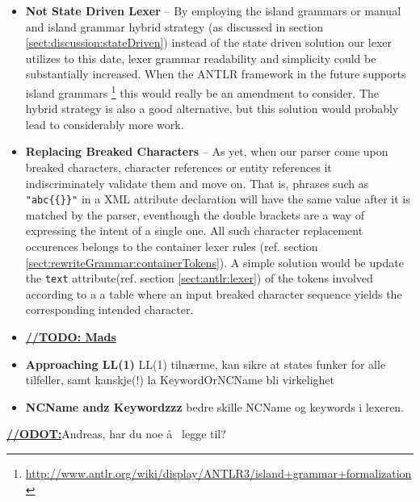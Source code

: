 \begin{itemize}

\item \textbf{Not State Driven Lexer} -- By employing the island grammars or manual and island grammar hybrid strategy (as discussed in section \ref{sect:discussion:stateDriven}) instead of the state driven solution our lexer utilizes to this date, lexer grammar readability and simplicity could be substantially increased. When the ANTLR framework in the future supports island grammars \footnote{\url{http://www.antlr.org/wiki/display/ANTLR3/island+grammar+formalization}} this would really be an amendment to consider. The hybrid strategy is also a good alternative, but this solution would probably lead to considerably more work.

\item \textbf{Replacing Breaked Characters} -- As yet, when our parser come upon breaked characters, character references or entity references it indiscriminately validate them and move on. That is, phrases such as \verb!"abc{{}}"! in a XML attribute declaration will have the same value after it is matched by the parser, eventhough the double brackets are a way of expressing the intent of a single one. All such character replacement occurences belongs to the container lexer rules (ref. section \ref{sect:rewriteGrammar:containerTokens}). A simple solution would be update the \verb!text! attribute(ref. section \ref{sect:antlr:lexer}) of the tokens involved according to a a table where an input breaked character sequence yields the corresponding intended character.


\item \underline{\textbf{\LARGE //TODO: Mads}} 

\item \textbf{Approaching LL(1)} LL(1) tiln\ae rme, kan sikre at states funker for alle tilfeller, samt kanskje(!) la KeywordOrNCName bli virkelighet

\item \textbf{NCName andz Keywordzzz} bedre skille NCName og keywords i lexeren.

\end{itemize}

\underline{\textbf{\LARGE //ODOT:}}Andreas, har du noe \aa~ legge til?





